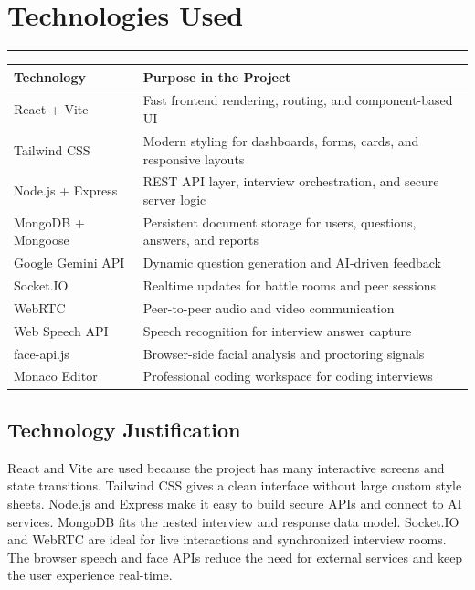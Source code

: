 ﻿\documentclass[12pt,a4paper]{article}
\newcommand{\sectionline}{\vspace{0.4em}\hrule\vspace{0.8em}}
\begin{document}
\clearpage

\section{Technologies Used}
\sectionline
\begin{table}[H]
\centering
\renewcommand{\arraystretch}{1.25}
\begin{tabularx}{\textwidth}{>{\raggedright\arraybackslash}p{3.2cm} >{\raggedright\arraybackslash}X}
\toprule
\rowcolor{SoftGreen}
\textbf{Technology} & \textbf{Purpose in the Project} \\
\midrule
React + Vite & Fast frontend rendering, routing, and component-based UI \\
Tailwind CSS & Modern styling for dashboards, forms, cards, and responsive layouts \\
Node.js + Express & REST API layer, interview orchestration, and secure server logic \\
MongoDB + Mongoose & Persistent document storage for users, questions, answers, and reports \\
Google Gemini API & Dynamic question generation and AI-driven feedback \\
Socket.IO & Realtime updates for battle rooms and peer sessions \\
WebRTC & Peer-to-peer audio and video communication \\
Web Speech API & Speech recognition for interview answer capture \\
face-api.js & Browser-side facial analysis and proctoring signals \\
Monaco Editor & Professional coding workspace for coding interviews \\
\bottomrule
\end{tabularx}
\end{table}

\subsection{Technology Justification}
React and Vite are used because the project has many interactive screens and state transitions. Tailwind CSS gives a clean interface without large custom style sheets. Node.js and Express make it easy to build secure APIs and connect to AI services. MongoDB fits the nested interview and response data model. Socket.IO and WebRTC are ideal for live interactions and synchronized interview rooms. The browser speech and face APIs reduce the need for external services and keep the user experience real-time.
\end{document}
